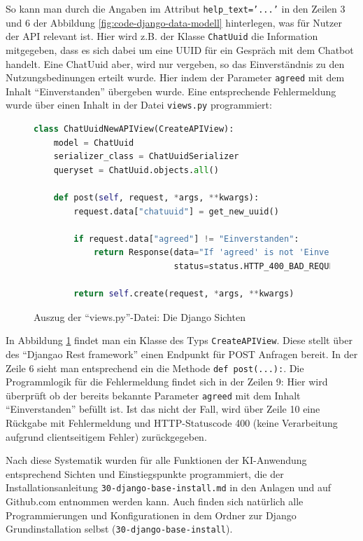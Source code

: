 \documentclass[12pt,oneside,titlepage,listof=totoc,bibliography=totoc]{scrartcl}
\newcommand{\code}[1]{\colorbox{code-gray}{\texttt{#1}}}
\begin{document}
So kann man durch die Angaben im Attribut \code{help_text='...'} in den Zeilen 3 und 6 der Abbildung \ref{fig:code-django-data-modell} hinterlegen, was für Nutzer der API relevant ist. Hier wird z.B. der Klasse \code{ChatUuid} die Information mitgegeben, dass es sich dabei um eine \ac{UUID} für ein Gespräch mit dem Chatbot handelt. Eine ChatUuid aber, wird nur vergeben, so das Einverständnis zu den Nutzungsbedinungen erteilt wurde. Hier indem der Parameter \code{agreed} mit dem Inhalt \enquote{Einverstanden} übergeben wurde. Eine entsprechende Fehlermeldung wurde über einen Inhalt in der Datei \code{views.py} programmiert: 

\begin{figure}[H]
	\caption{Auszug der \enquote{views.py}-Datei: Die Django Sichten}
	\label{fig:code-django-views}
\begin{lstlisting}[language=python]
class ChatUuidNewAPIView(CreateAPIView):
    model = ChatUuid
    serializer_class = ChatUuidSerializer
    queryset = ChatUuid.objects.all()

    def post(self, request, *args, **kwargs):
        request.data["chatuuid"] = get_new_uuid()

        if request.data["agreed"] != "Einverstanden":
            return Response(data="If 'agreed' is not 'Einverstanden' you can not use the services.",
                            status=status.HTTP_400_BAD_REQUEST)

        return self.create(request, *args, **kwargs)
\end{lstlisting}
\end{figure}

In Abbildung \ref{fig:code-django-views} findet man ein Klasse des Typs \code{CreateAPIView}. Diese stellt über des \enquote{Djangao Rest framework} einen Endpunkt für POST Anfragen bereit. In der Zeile 6 sieht man entsprechend ein die Methode \code{def post(...):}. Die Programmlogik für die Fehlermeldung findet sich in der Zeilen 9: Hier wird überprüft ob der bereits bekannte Parameter \code{agreed} mit dem Inhalt \enquote{Einverstanden} befüllt ist. Ist das nicht der Fall, wird über Zeile 10 eine Rückgabe mit Fehlermeldung und HTTP-Statuscode 400 (keine Verarbeitung aufgrund clientseitigem Fehler) zurückgegeben.

Nach diese Systematik wurden für alle Funktionen der KI-Anwendung entsprechend Sichten und Einstiegspunkte programmiert, die der Installationsanleitung \code{30-django-base-install\README.md} in den Anlagen und auf Github.com entnommen werden kann. Auch finden sich natürlich alle Programmierungen und Konfigurationen in dem Ordner zur Django Grundinstallation selbst (\code{30-django-base-install}).
\end{document}
